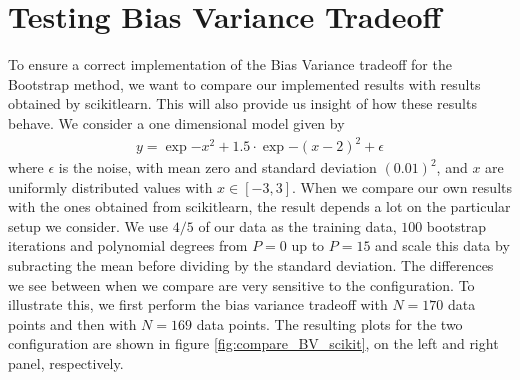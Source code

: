 \documentclass[reprint,english,notitlepage,aps,nobalancelastpage,nofootinbib]{revtex4-1}  %
\begin{document}
\section{Testing Bias Variance Tradeoff}
To ensure a correct implementation of the Bias Variance tradeoff for the Bootstrap method, we want to compare our implemented results with results obtained by scikitlearn. This will also provide us insight of how these results behave. We consider a one dimensional model given by
\begin{align*}
  y = \exp{-x^2} + 1.5\cdot\exp{-(x-2)^2} + \epsilon
\end{align*}
where $\epsilon$ is the noise, with mean zero and standard deviation $(0.01)^2$, and $x$ are uniformly distributed values with $x\in[-3,3]$. When we compare our own results with the ones obtained from scikitlearn, the result depends a lot on the particular setup we consider. We use $4/5$ of our data as the training data, $100$ bootstrap iterations and polynomial degrees from $P=0$ up to $P=15$ and scale this data by subracting the mean before dividing by the standard deviation. The differences we see between when we compare are very sensitive to the configuration. To illustrate this, we first perform the bias variance tradeoff with $N=170$ data points and then with $N=169$ data points. The resulting plots for the two configuration are shown in figure \ref{fig:compare_BV_scikit}, on the left and right panel, respectively.
\end{document}
